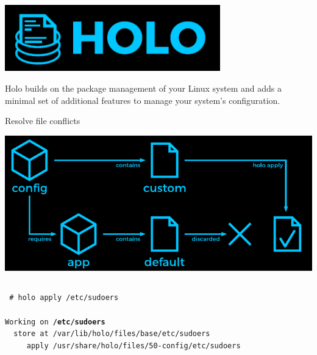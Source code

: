 \documentclass{beamer}
\begin{document}
\begin{frame}[plain,c]
 ~\vspace{3em}\par
 \centering
 \includegraphics[width=0.7\textwidth]{holo-logo.pdf}
 \vspace{1em}\par\color{holoonblack}
 \small Holo builds on the package management of your Linux system and adds a minimal set of additional features to manage your system's configuration.
\end{frame}

\begin{frame}[plain,t]{Resolve file conflicts}
 \vspace{-1em}\begin{center}
  \includegraphics[width=\linewidth]{diagram-files3.pdf}
 \end{center}
 \begin{columns}\column{\dimexpr\paperwidth-15pt}
  \small\texttt{%
   {\color{holoonblack}\#} holo apply /etc/sudoers\\
   ~\\
   Working on \textbf{/etc/sudoers}\\
   ~~store at /var/lib/holo/files/base/etc/sudoers\\
   ~~~~~apply /usr/share/holo/files/50-config/etc/sudoers
  }
 \end{columns}
\end{frame}
\end{document}
